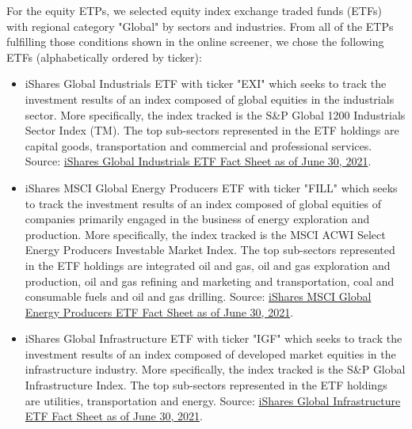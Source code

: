     For the equity ETPs, we selected equity index exchange traded funds (ETFs) with regional category "Global" by sectors and industries. From all of the ETPs fulfilling those conditions shown in the online screener, we chose the following ETFs (alphabetically ordered by ticker):
    \begin{itemize}
        \item iShares Global Industrials ETF with ticker "EXI" which seeks to track the investment results of an index composed of global equities in the industrials sector. More specifically, the index tracked is the S{\&}P Global 1200 Industrials Sector Index (TM). The top sub-sectors represented in the ETF holdings are capital goods, transportation and commercial and professional services. Source: \href{https://www.ishares.com/us/literature/fact-sheet/exi-ishares-global-industrials-etf-fund-fact-sheet-en-us.pdf}{iShares Global Industrials ETF Fact Sheet as of June 30, 2021}.%
    
        \item iShares MSCI Global Energy Producers ETF with ticker "FILL" which seeks to track the investment results of an index composed of global equities of companies primarily engaged in the business of energy exploration and production. More specifically, the index tracked is the MSCI ACWI Select Energy Producers Investable Market Index. The top sub-sectors represented in the ETF holdings are integrated oil and gas, oil and gas exploration and production, oil and gas refining and marketing and transportation, coal and consumable fuels and oil and gas drilling. Source: \href{https://www.ishares.com/us/literature/fact-sheet/fill-ishares-msci-global-energy-producers-etf-fund-fact-sheet-en-us.pdf}{iShares MSCI Global Energy Producers ETF Fact Sheet as of June 30, 2021}. %
    
        \item iShares Global Infrastructure ETF with ticker "IGF" which seeks to track the investment results of an index composed of developed market equities in the infrastructure industry. More specifically, the index tracked is the S{\&}P Global Infrastructure Index. The top sub-sectors represented in the ETF holdings are utilities, transportation and energy. Source: \href{https://www.ishares.com/us/literature/fact-sheet/igf-ishares-global-infrastructure-etf-fund-fact-sheet-en-us.pdf}{iShares Global Infrastructure ETF Fact Sheet as of June 30, 2021}.%
    

\end{itemize}
